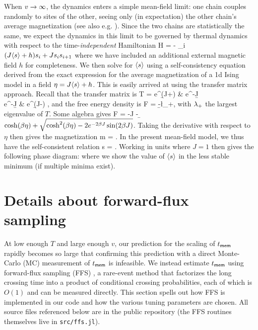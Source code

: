 \documentclass[12pt]{article}
\newcommand{\tmem}{t_{\sf mem}}
\begin{document}
When $v \rightarrow \infty$, the dynamics enters a simple mean-field limit: one chain couples randomly to sites of the other, seeing only (in expectation) the other chain's average magnetization (see also e.g.  \cite{kadau2008magnetic}). Since the two chains are statistically the same, we expect the dynamics in this limit to be governed by thermal dynamics with respect to the time-{\it independent} Hamiltonian 
\be H = - \sum_i \( (J \lan s\ran + h) s_i + J s_is_{i+1}\)\ee
where we have included an additional external magnetic field $h$ for completeness.  
We then solve for $\langle s\rangle$ using a self-consistency equation derived from the exact expression for the average magnetization of a 1d Ising model in a field $\eta=J \langle s \rangle + h$. This is easily arrived at using the transfer matrix approach. Recall that the transfer matrix is 
\be T = \bpm e^{\b (J+\eta)} & e^{-\b J} \\ e^{-\b J} & e^{\b(J-\eta)} \epm,\ee 
and the free energy density is 
\be F = -\b \ln \l_+,\ee 
with $\lambda_+$ the largest eigenvalue of $T$. Some algebra gives 
\be F = -J - \b \ln\( \cosh(\b \eta) + \sqrt{\cosh^2(\b\eta) - 2e^{-2\b J} \sin(2\b J)}\).\ee 
Taking the derivative with respect to $\eta$ then gives the magnetization 
\be m = .\ee 
In the present mean-field model, we thus have the self-consistent relation 
\be \lan s \ran = .\ee 
Working in units where $J=1$ then gives the following phase diagram: 
\be {}\ee 
where we show the value of $\langle s\rangle$ in the less stable minimum (if multiple minima exist). 

\section{Details about forward-flux sampling}
\label{sec:ffs}

At low enough $T$ and large enough $v$, our prediction for the scaling of $\tmem$ rapidly becomes so large that confirming this prediction with a direct Monte-Carlo (MC) measurement of $\tmem$ is infeasible. We instead estimate $\tmem$ using forward-flux sampling (FFS) \cite{allen2009forward}, a rare-event method that factorizes the long crossing time into a product of conditional crossing probabilities, each of which is $O(1)$ and can be measured directly. This section spells out how FFS is implemented in our code and how the various tuning parameters are chosen. All  source files referenced below are in the public repository \cite{code} (the FFS routines themselves live in \texttt{src/ffs.jl}).
\end{document}

